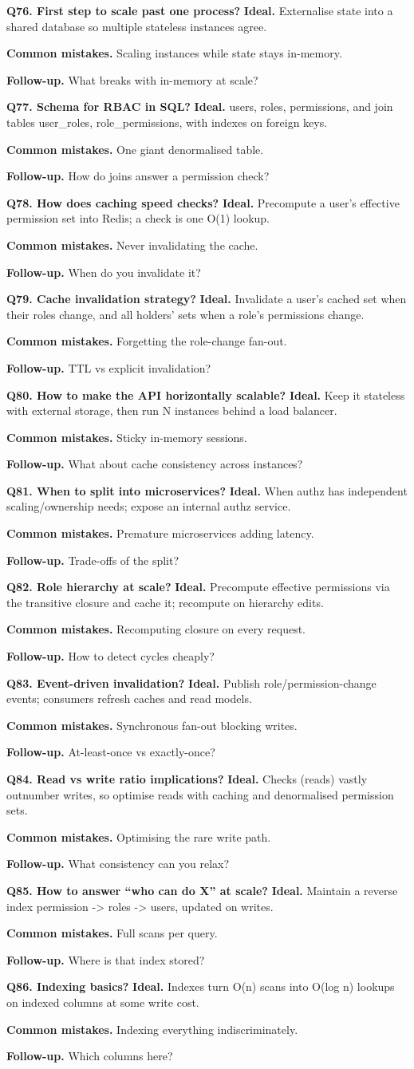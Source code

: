 \documentclass[11pt,a4paper]{report}
\newcommand{\qa}[3]{%
  \textbf{Ideal.} #1\par
  \textbf{Common mistakes.} #2\par
  \textbf{Follow-up.} #3\par
  \vspace{4pt}
}
\begin{document}
\textbf{Q76. First step to scale past one process?}
\qa{Externalise state into a shared database so multiple stateless instances
agree.}
{Scaling instances while state stays in-memory.}
{What breaks with in-memory at scale?}

\textbf{Q77. Schema for RBAC in SQL?}
\qa{users, roles, permissions, and join tables user\_roles, role\_permissions,
with indexes on foreign keys.}
{One giant denormalised table.}
{How do joins answer a permission check?}

\textbf{Q78. How does caching speed checks?}
\qa{Precompute a user's effective permission set into Redis; a check is one O(1)
lookup.}
{Never invalidating the cache.}
{When do you invalidate it?}

\textbf{Q79. Cache invalidation strategy?}
\qa{Invalidate a user's cached set when their roles change, and all holders' sets
when a role's permissions change.}
{Forgetting the role-change fan-out.}
{TTL vs explicit invalidation?}

\textbf{Q80. How to make the API horizontally scalable?}
\qa{Keep it stateless with external storage, then run N instances behind a load
balancer.}
{Sticky in-memory sessions.}
{What about cache consistency across instances?}

\textbf{Q81. When to split into microservices?}
\qa{When authz has independent scaling/ownership needs; expose an internal authz
service.}
{Premature microservices adding latency.}
{Trade-offs of the split?}

\textbf{Q82. Role hierarchy at scale?}
\qa{Precompute effective permissions via the transitive closure and cache it;
recompute on hierarchy edits.}
{Recomputing closure on every request.}
{How to detect cycles cheaply?}

\textbf{Q83. Event-driven invalidation?}
\qa{Publish role/permission-change events; consumers refresh caches and read
models.}
{Synchronous fan-out blocking writes.}
{At-least-once vs exactly-once?}

\textbf{Q84. Read vs write ratio implications?}
\qa{Checks (reads) vastly outnumber writes, so optimise reads with caching and
denormalised permission sets.}
{Optimising the rare write path.}
{What consistency can you relax?}

\textbf{Q85. How to answer ``who can do X'' at scale?}
\qa{Maintain a reverse index permission -> roles -> users, updated on writes.}
{Full scans per query.}
{Where is that index stored?}

\textbf{Q86. Indexing basics?}
\qa{Indexes turn O(n) scans into O(log n) lookups on indexed columns at some write
cost.}
{Indexing everything indiscriminately.}
{Which columns here?}
\end{document}
